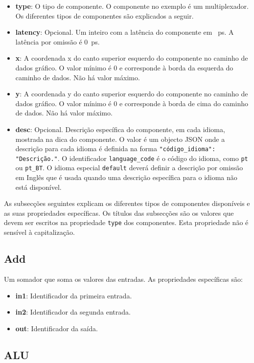 \documentclass[11pt,a4paper,twoside,titlepage]{report}
\begin{document}
\begin{itemize}
	\item \textbf{type}: O tipo de componente. O componente no exemplo é um
		multiplexador. Os diferentes tipos de componentes são explicados a seguir.
	\item \textbf{latency}: Opcional. Um inteiro com a latência do componente em
		\SI{}{\pico\second}. A latência por omissão é \SI{0}{\pico\second}.
	\item \textbf{x}: A coordenada x do canto superior esquerdo do componente no
		caminho de dados gráfico. O valor mínimo é 0 e corresponde à borda da
		esquerda do caminho de dados. Não há valor máximo.
	\item \textbf{y}: A coordenada y do canto superior esquerdo do componente no
		caminho de dados gráfico. O valor mínimo é 0 e corresponde à borda de
		cima do caminho de dados. Não há valor máximo.
	\item \textbf{desc}: Opcional. Descrição específica do componente, em cada
		idioma, mostrada na dica do componente.
		O valor é um objecto JSON onde a descrição para cada idioma é definida na
		forma \verb+"código_idioma": "Descrição."+. O identificador
		\verb+language_code+ é o código do idioma, como \verb+pt+ ou \verb+pt_BT+.
		O idioma especial \verb+default+ deverá definir a descrição por omissão em
		Inglês que é usada quando uma descrição específica para o idioma não está
		disponível.
\end{itemize}

As subsecções seguintes explicam os diferentes tipos de componentes disponíveis
e as suas propriedades específicas.
Os títulos das subsecções são os valores que devem ser escritos na propriedade
\verb+type+ dos componentes. Esta propriedade não é sensível à capitalização.

\subsection{Add}

Um somador que soma os valores das entradas. As propriedades específicas são:
\begin{itemize}
	\item \textbf{in1}: Identificador da primeira entrada.
	\item \textbf{in2}: Identificador da segunda entrada.
	\item \textbf{out}: Identificador da saída.
\end{itemize}

\subsection{ALU}
\end{document}
